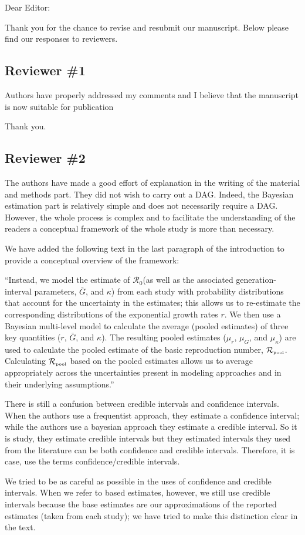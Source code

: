\documentclass[12pt]{article}
\newcommand{\Ro}{\ensuremath{{\mathcal R}_{0}}\xspace}
\newcommand{\Rpool}{\ensuremath{{\mathcal R}_{\textrm{\tiny{pool}}}}\xspace}
\newcommand{\rev}{\subsection*}
\newcommand{\revtext}{\textsf}
\begin{document}
\noindent Dear Editor:

Thank you for the chance to revise and resubmit our manuscript.
Below please find our responses to reviewers.

\rev{Reviewer \#1}

\revtext{Authors have properly addressed my comments and I believe that the manuscript is now suitable for publication}

Thank you.

\rev{Reviewer \#2}

\revtext{
The authors have made a good effort of explanation in the writing of the material and methods
part. They did not wish to carry out a DAG. Indeed, the Bayesian estimation part is relatively
simple and does not necessarily require a DAG. However, the whole process is complex and
to facilitate the understanding of the readers a conceptual framework of the whole study is
more than necessary.}

We have added the following text in the last paragraph of the introduction to provide a conceptual overview of the framework:

``Instead, we model the estimate of \Ro (as well as the associated generation-interval parameters, $\bar G$, and $\kappa$) from each study with probability distributions that account for the uncertainty in the estimates;
this allows us to re-estimate the corresponding distributions of the exponential growth rates $r$.
We then use a Bayesian multi-level model to calculate the average (pooled estimates) of three key quantities ($r$, $\bar G$, and $\kappa$).
The resulting pooled estimates ($\mu_r$, $\mu_G$, and $\mu_\kappa$) are used to calculate the pooled estimate of the basic reproduction number, \Rpool.
Calculating \Rpool based on the pooled estimates allows us to average appropriately across the uncertainties present in modeling approaches and in their underlying assumptions.''

\revtext{There is still a confusion between credible intervals and confidence
intervals. When the authors use a frequentist approach, they estimate a confidence interval;
while the authors use a bayesian approach they estimate a credible interval. So it is study,
they estimate credible intervals but they estimated intervals they used from the literature can
be both confidence and credible intervals. Therefore, it is case, use the terms
confidence/credible intervals.}

We tried to be as careful as possible in the uses of confidence and credible intervals.
When we refer to based estimates, however, we still use credible intervals because the base estimates are our approximations of the reported estimates (taken from each study); we have tried to make this distinction clear in the text.
\end{document}
